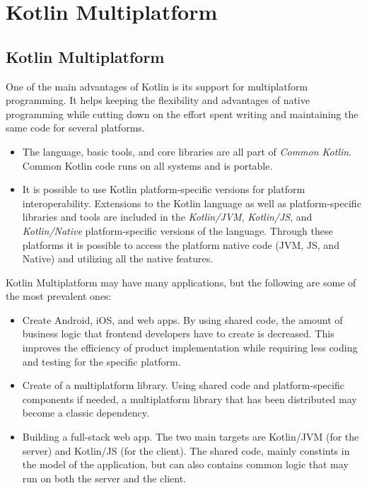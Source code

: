 \chapter{Kotlin Multiplatform}
\section{Kotlin Multiplatform}
\label{sec:kotlin-multiplatform}
One of the main advantages of Kotlin is its support for multiplatform programming.
It helps keeping the flexibility and advantages of native programming while cutting down on
the effort spent writing and maintaining the same code for several platforms.


\begin{itemize}
	\item The language, basic tools, and core libraries are all part of \emph{Common Kotlin}. Common Kotlin code runs on all systems and is portable.
	\item It is possible to use Kotlin platform-specific versions for platform interoperability. Extensions to the Kotlin language as well as platform-specific libraries and tools are included in the \emph{Kotlin/JVM}, \emph{Kotlin/JS}, and \emph{Kotlin/Native} platform-specific versions of the language.
	Through these platforms it is possible to access the platform native code (JVM, JS, and Native) and utilizing all the native features.
\end{itemize}

Kotlin Multiplatform may have many applications, but the following are some of the most prevalent ones:

\begin{itemize}
	\item Create Android, iOS, and web apps. By using shared code, the amount of business logic that frontend developers have to create is decreased.
	This improves the efficiency of product implementation while requiring less coding and testing for the specific platform.
	\item Create of a multiplatform library.
	Using shared code and platform-specific components if needed, a multiplatform library that has been distributed may become a classic dependency.
	\item Building a full-stack web app. The two main targets are Kotlin/JVM (for the server) and Kotlin/JS (for the client). The shared code, mainly constints in the model of the application, but can also contains common logic that may run on both the server and the client.
\end{itemize}
